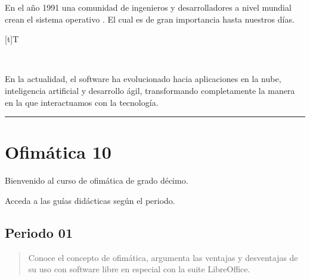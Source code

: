 \documentclass[letterpaper,10pt,spanish]{sphinxmanual}
\let\sphinxpxdimen\pdfpxdimen\else\newdimen\sphinxpxdimen
\begin{document}
\sphinxAtStartPar
\sphinxfootnotemark[11] En el año 1991 una comunidad de ingenieros y desarrolladores a nivel mundial crean el sistema operativo . El cual es de gran importancia hasta nuestros días.


\begin{savenotes}\sphinxattablestart
\sphinxthistablewithglobalstyle
\centering
\begin{tabulary}{\linewidth}[t]{T}
\sphinxtoprule
\sphinxtableatstartofbodyhook

\begin{sphinxfigure-in-table}
\centering
\capstart
\noindent\sphinxincludegraphics[width=400\sphinxpxdimen]{{image10}.png}
\label{\detokenize{cursos/informatica10/recursos/T01:id35}}\end{sphinxfigure-in-table}\relax
\\
\sphinxbottomrule
\end{tabulary}
\sphinxtableafterendhook\par
\sphinxattableend\end{savenotes}

\sphinxAtStartPar
En la actualidad, el software ha evolucionado hacia aplicaciones en la nube, inteligencia artificial y desarrollo ágil, transformando completamente la manera en la que interactuamos con la tecnología.


\bigskip\hrule\bigskip


\sphinxstepscope


\chapter{Ofimática 10}
\label{\detokenize{cursos/ofimatica10/index:ofimatica-10}}\label{\detokenize{cursos/ofimatica10/index::doc}}
\sphinxAtStartPar
Bienvenido al curso de ofimática de grado décimo.

\sphinxAtStartPar
Acceda a las guías didácticas según el periodo.

\sphinxstepscope


\section{Periodo 01}
\label{\detokenize{cursos/ofimatica10/periodo01/index:periodo-01}}\label{\detokenize{cursos/ofimatica10/periodo01/index::doc}}\begin{quote}\begin{description}
\sphinxAtStartPar
Conoce el concepto de ofimática, argumenta las ventajas y desventajas de su uso con software libre en especial con la suite LibreOffice.

\end{description}\end{quote}
\end{document}
